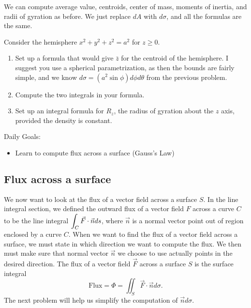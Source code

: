 We can compute average value, centroids, center of mass, moments of inertia, and radii of gyration as before.  We just replace $dA$ with $d\sigma$, and all the formulas are the same. 


\begin{problem}
 Consider the hemisphere $x^2+y^2+z^2=a^2$ for $z\geq 0$. 
\begin{enumerate}
 \item Set up a formula that would give $\bar z$ for the centroid of the hemisphere. I suggest you use a spherical parametrization, as then the bounds are fairly simple, and we know $d\sigma = (a^2\sin\phi) d\phi d\theta$ from the previous problem.
 \item Compute the two integrals in your formula. %
 \item Set up an integral formula for $R_z$, the radius of gyration about the $z$ axis, provided the density is constant.
\end{enumerate}
\end{problem}


\uday
\normalsize
Daily Goals:\\
\begin{itemize}
\item Learn to compute flux across a surface (Gauss's Law)
\end{itemize}

\subsection{Flux across a surface}

We now want to look at the flux of a vector field across a surface $S$.  In the line integral section, we defined the outward flux of a vector field $F$ across a curve $C$ to be the line integral $\displaystyle \int_C \vec F\cdot \vec n ds$, where $\vec n$ is a normal vector point out of region enclosed by a curve $C$. When we want to find the flux of a vector field across a surface, we must state in which direction we want to compute the flux. We then must make sure that normal vector $\vec n$ we choose to use actually points in the desired direction. The flux of a vector field $\vec F$ across a surface $S$ is the surface integral
$$\text{Flux}=\Phi 
= \iint_S \vec F\cdot \vec n d\sigma 
.$$
The next problem will help us simplify the computation of $\vec nd\sigma$.

